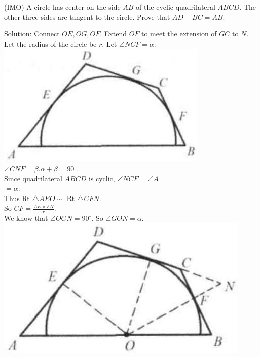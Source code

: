 \documentclass{article}
\begin{document}
(IMO) A circle has center on the side \(A B\) of the cyclic quadrilateral \(A B C D\). The other three sides are tangent to the circle. Prove that \(A D+B C=A B\).

Solution:
Connect \(O E, O G, O F\). Extend \(O F\) to meet the extension of \(G C\) to \(N\).\\
Let the radius of the circle be \(r\). Let \(\angle N C F=\alpha\).\\
\centering
\includegraphics[width=\textwidth]{images/149.jpg}\\
\(\angle C N F=\beta . \alpha+\beta=90^{\circ}\).\\
Since quadrilateral \(A B C D\) is cyclic, \(\angle N C F=\angle A\)\\
\(=\alpha\).\\
Thus Rt \(\triangle A E O \sim\) Rt \(\triangle C F N\).\\
So \(C F=\frac{A E \times F N}{r}\).\\
We know that \(\angle O G N=90^{\circ}\). So \(\angle G O N=\alpha\).\\
\centering
\includegraphics[width=\textwidth]{images/149(2).jpg}
\end{document}
